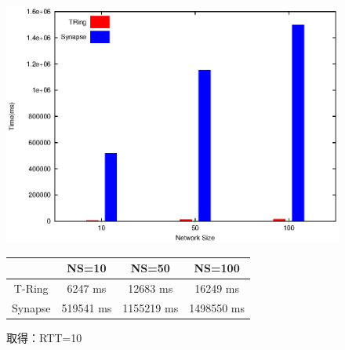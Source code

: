 \begin{figure}[htbp]
\begin{minipage}{1\textwidth}
    \centering
\includegraphics[width=14cm]{./images/compare_retrieve_rtt10.eps}
\begin{center}
  \begin{tabular}{|c||c|c|c|} \hline
  \backslashbox{}{} & NS=10 & NS=50 & NS=100  \\ \hline \hline
       T-Ring & 6247 ms & 12683 ms & 16249 ms  \\ \hline
       Synapse & 519541  ms & 1155219 ms & 1498550 ms \\ \hline
  \end{tabular}
\end{center}
\caption{取得：RTT=10}
 \label{fig:compare_retrieve_rtt10}
 \end{minipage}
\end{figure}

